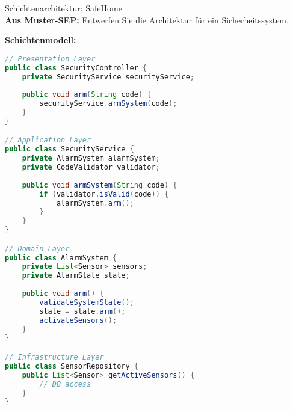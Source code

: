 \begin{example2}{Schichtenarchitektur: SafeHome}\\
\textbf{Aus Muster-SEP:} Entwerfen Sie die Architektur für ein Sicherheitssystem.

\textbf{Schichtenmodell:}
\begin{lstlisting}[language=Java, style=basesmol]
// Presentation Layer
public class SecurityController {
    private SecurityService securityService;
    
    public void arm(String code) {
        securityService.armSystem(code);
    }
}

// Application Layer
public class SecurityService {
    private AlarmSystem alarmSystem;
    private CodeValidator validator;
    
    public void armSystem(String code) {
        if (validator.isValid(code)) {
            alarmSystem.arm();
        }
    }
}

// Domain Layer
public class AlarmSystem {
    private List<Sensor> sensors;
    private AlarmState state;
    
    public void arm() {
        validateSystemState();
        state = state.arm();
        activateSensors();
    }
}

// Infrastructure Layer
public class SensorRepository {
    public List<Sensor> getActiveSensors() {
        // DB access
    }
}
\end{lstlisting}
\end{example2}


